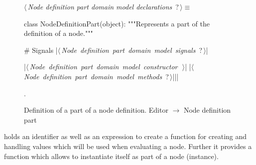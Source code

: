 \documentclass[%
    a4paper,    %
    justified,  %
    nobib,      %
    openany     %
]{tufte-book}
\begin{document}
\begin{figure}
\begin{flushleft} \small
\begin{minipage}{\linewidth}\label{scrap109}\raggedright\small
{} $\langle\,${\itshape Node definition part domain model declarations}\nobreak\ {\footnotesize {?}}$\,\rangle\equiv$
\vspace{-1ex}
\begin{pythoncode}
class NodeDefinitionPart(object):
    """Represents a part of the definition of a node."""

    # Signals
    |\hbox{$\langle\,${\itshape Node definition part domain model signals}\nobreak\ {\footnotesize ?}$\,\rangle$}|

    |\hbox{$\langle\,${\itshape Node definition part domain model constructor}\nobreak\ {\footnotesize {}}$\,\rangle$}|
    |\hbox{$\langle\,${\itshape Node definition part domain model methods}\nobreak\ {\footnotesize ?}$\,\rangle$}||\NWsep|
\end{pythoncode}
\vspace{1.5ex}
\footnotesize
\begin{list}{}{\setlength{\itemsep}{-\parsep}\setlength{\itemindent}{-\leftmargin}}
\item {\NWtxtMacroNoRef}.

\item{}
\end{list}
\end{minipage}\vspace{4ex}
\end{flushleft}
\caption{Definition of a part of a node definition.
  \newline{}\newline{}Editor $\rightarrow$ Node definition part}
\label{editor:lst:node-definition-part}
\end{figure}

 holds an identifier as well as an
expression to create a function for creating and handling values which will be
used when evaluating a node. Further it provides a function which allows to
instantiate itself as part of a node (instance).
\end{document}
